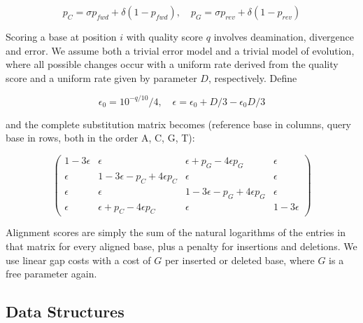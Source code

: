 \documentclass[11pt,a4paper]{report}
\begin{document}
\begin{equation*}
p_{C} = \sigma p_{fwd} + \delta (1 - p_{fwd}), \quad
p_{G} = \sigma p_{rev} + \delta (1 - p_{rev}) 
\end{equation*}

Scoring a base at position $i$ with quality score $q$ involves
deamination, divergence and error.  We assume both a trivial error model
and a trivial model of evolution, where all possible changes occur with
a uniform rate derived from the quality score and a uniform rate given
by parameter $D$, respectively.  Define 

\begin{equation*}
\epsilon_0 = {10^{-q/10}}/4, \quad \epsilon = \epsilon_0 + D/3 - \epsilon_0 D/3
\end{equation*}

and the complete substitution matrix becomes (reference base in columns,
query base in rows, both in the order A, C, G, T):

\begin{equation*}
\left( \begin{array}{cccc}
1 - 3 \epsilon &       \epsilon                            &       \epsilon + p_{G} - 4 \epsilon p_{G} &       \epsilon \\
      \epsilon & 1 - 3 \epsilon - p_{C} + 4 \epsilon p_{C} &       \epsilon                            &       \epsilon \\
      \epsilon &       \epsilon                            & 1 - 3 \epsilon - p_{G} + 4 \epsilon p_{G} &       \epsilon \\
      \epsilon &       \epsilon + p_{C} - 4 \epsilon p_{C} &       \epsilon                            & 1 - 3 \epsilon 
\end{array} \right)
\end{equation*}

Alignment scores are simply the sum of the natural logarithms of the
entries in that matrix for every aligned base, plus a penalty for
insertions and deletions.  We use linear gap costs with a cost of $G$
per inserted or deleted base, where $G$ is a free parameter again.



\subsection{Data Structures}  \label{Data Structures}
\end{document}
